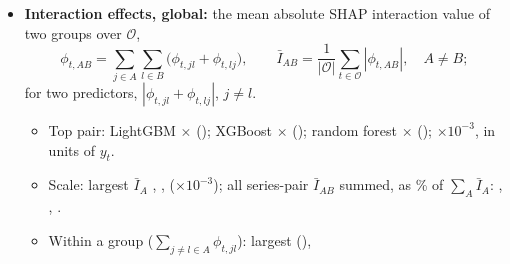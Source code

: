 \begin{itemize}
\begin{itemize}
  \item Aggregate of the ranks vs rank of the aggregate, the mean absolute SHAP value over $\mathcal O$,
    $\bar I_A = |\mathcal O|^{-1} \sum_{t \in \mathcal O} |\phi_{t,A}|$: \rhfiLgbmSpGlobal, \rhfiXgbSpGlobal, \rhfiRfSpGlobal.
  \item Predictor level ($n = \rhfiP$): Kendall's $W = \rhfiLgbmWCols$, \rhfiXgbWCols, \rhfiRfWCols.
  \item Agreement of $\bar r_A$ across models (Spearman rank correlation): trees \rhfiSpTreesMin--\rhfiSpTreesMax;
    tree vs linear \rhfiSpTreeLinMin--\rhfiSpTreeLinMax; lasso vs ridge \rhfiSpLassoRidge.
  \end{itemize}
\item \textbf{Interaction effects, global:} the mean absolute SHAP interaction value of two groups over
  $\mathcal O$,
  \[
    \phi_{t,AB} = \sum_{j \in A} \sum_{l \in B} \bigl(\phi_{t,jl} + \phi_{t,lj}\bigr), \qquad
    \bar I_{AB} = \frac{1}{|\mathcal O|} \sum_{t \in \mathcal O} |\phi_{t,AB}|, \quad A \ne B;
  \]
  for two predictors, $|\phi_{t,jl} + \phi_{t,lj}|$, $j \ne l$.
  \begin{itemize}
  \item Top pair: LightGBM \rhfiLgbmInterTopA{} $\times$ \rhfiLgbmInterTopB{} (\rhfiLgbmInterTopVal);
    XGBoost \rhfiXgbInterTopA{} $\times$ \rhfiXgbInterTopB{} (\rhfiXgbInterTopVal); random forest
    \rhfiRfInterTopA{} $\times$ \rhfiRfInterTopB{} (\rhfiRfInterTopVal); $\times 10^{-3}$, in units of $y_t$.
  \item Scale: largest $\bar I_A$ \rhfiLgbmMainTopVal, \rhfiXgbMainTopVal, \rhfiRfMainTopVal{} ($\times 10^{-3}$); all
    series-pair $\bar I_{AB}$ summed, as \% of $\sum_A \bar I_A$: \rhfiLgbmInterRatio, \rhfiXgbInterRatio,
    \rhfiRfInterRatio.
  \item Within a group ($\sum_{j \ne l \in A} \phi_{t,jl}$): largest \rhfiLgbmWithinTop{} (\rhfiLgbmWithinTopVal),

\end{itemize}
\end{itemize}
